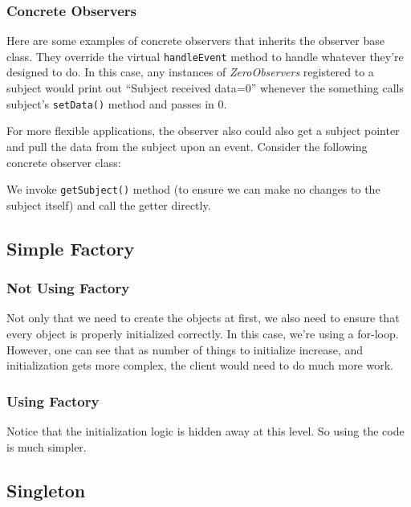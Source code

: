 \subsubsection{Concrete Observers}
Here are some examples of concrete observers that inherits the observer base class. They override the virtual \texttt{handleEvent} method to handle whatever they're designed to do. In this case, any instances of \textit{ZeroObservers} registered to a subject would print out ``Subject received data=0'' whenever the something calls subject's \texttt{setData()} method and passes in 0.

For more flexible applications, the observer also could also get a subject pointer and pull the data from the subject upon an event. Consider the following concrete observer class:

We invoke \texttt{getSubject()} method (to ensure we can make no changes to the subject itself) and call the getter directly.



\subsection{Simple Factory}
\label{code:simple-factory}
\subsubsection{Not Using Factory}
Not only that we need to create the objects at first, we also need to ensure that every object is properly initialized correctly. In this case, we're using a for-loop. However, one can see that as number of things to initialize increase, and initialization gets more complex, the client would need to do much more work.

\subsubsection{Using Factory}
Notice that the initialization logic is hidden away at this level. So using the code is much simpler.


\subsection{Singleton}
\label{code:singleton}